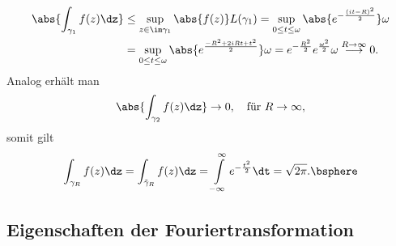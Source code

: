 \begin{bsp}
\begin{align*}
\abs{\int_{\gamma_1} f(z)\dz} &\le \sup\limits_{z\in\im\gamma_1}
\abs{f(z)}L(\gamma_1)
= \sup\limits_{0\le t\le\omega} \abs{e^{-\frac{(it-R)^2}{2}}}\omega\\
&= \sup\limits_{0\le t\le\omega} \abs{e^{\frac{-R^2+2iRt+t^2}{2}}}\omega
= e^{-\frac{R^2}{2}}e^{\frac{\omega^2}{2}}\omega\overset{R\to\infty}{\longrightarrow}
0.
\end{align*}
Analog erhält man
\begin{align*}
\abs{\int_{\gamma_2} f(z)\dz} \to 0,\quad \text{für } R\to\infty,
\end{align*}
somit gilt
\begin{align*}
\int_{\gamma_R} f(z)\dz = \int_{\tilde{\gamma}_R} f(z)\dz
= \int\limits_{-\infty}^\infty e^{-\frac{t^2}{2}}\dt = \sqrt{2\pi}.\bsphere
\end{align*}
\end{bsp}

\subsection{Eigenschaften der Fouriertransformation}

